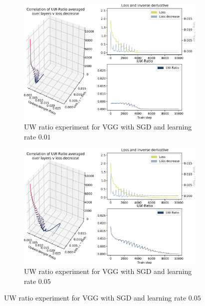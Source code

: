 \begin{figure}
    \begin{subfigure}{\textwidth}
        \centering
        \includegraphics[width=\linewidth]{gfx/diagrams/experiments/ratio_loss_correlation/vgg_sgd_001_0_10000.pdf}
        \caption{UW ratio experiment for VGG with SGD and learning rate $0.01$}
        \label{fig:ratio_loss_corr_vgg_sgd_001}
    \end{subfigure}

    \begin{subfigure}{\textwidth}
        \centering
        \includegraphics[width=\linewidth]{gfx/diagrams/experiments/ratio_loss_correlation/vgg_sgd_005_0_10000.pdf}
        \caption{UW ratio experiment for VGG with SGD and learning rate $0.05$}
        \label{fig:ratio_loss_corr_vgg_sgd_005}
    \end{subfigure}


\end{figure}
